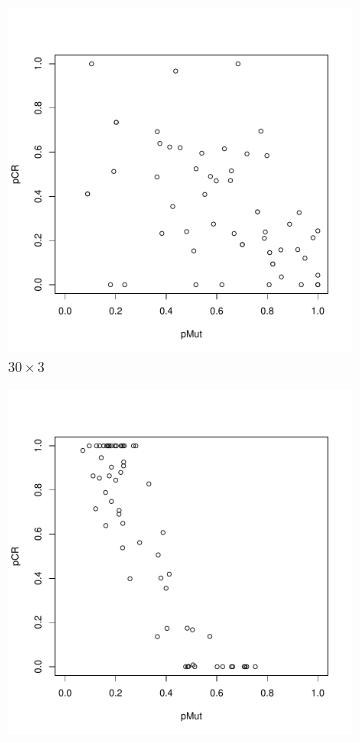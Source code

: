 \documentclass [PhD] {package/uclathes}
\begin{document}
\begin{figure}%
\centering
\begin{subfigure}[b]{0.3\textwidth}
\includegraphics{chapters/RSO/pdfs/scatter30}
\caption{$30\times 3$}
\end{subfigure}
\begin{subfigure}[b]{0.3\textwidth}
\includegraphics{chapters/RSO/pdfs/scatter50}

\end{subfigure}
\end{figure}
\end{document}
